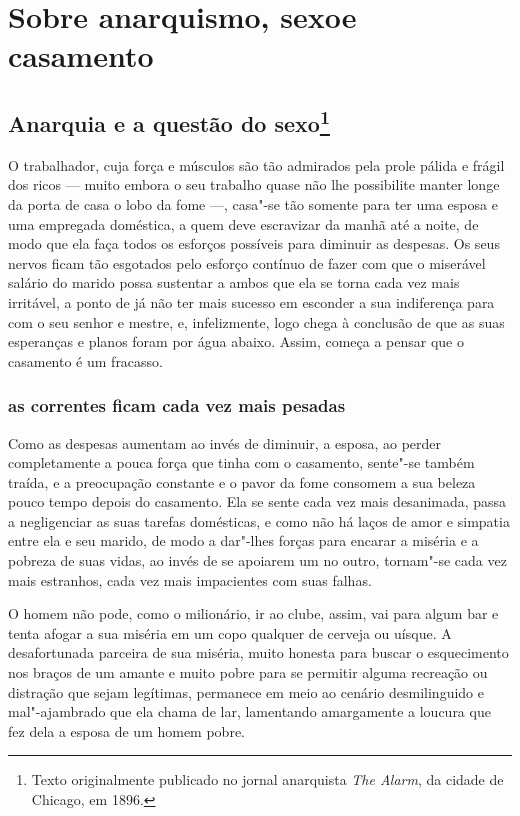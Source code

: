 \part[Sobre anarquismo, sexo e casamento]{Sobre anarquismo, sexo\break e casamento}

\pagestyle{baruch}

\chapter{Anarquia e a questão do sexo\footnote{Texto originalmente publicado no
  jornal anarquista \textit{The Alarm}, da cidade de Chicago, em 1896.}}
\label{ref1}

O trabalhador, cuja força e músculos são tão admirados pela prole pálida
e frágil dos ricos --- muito embora o seu trabalho quase não lhe
possibilite manter longe da porta de casa o lobo da fome ---, casa"-se tão
somente para ter uma esposa e uma empregada doméstica, a quem deve
escravizar da manhã até a noite, de modo que ela faça todos os esforços
possíveis para diminuir as despesas. Os seus nervos ficam tão esgotados
pelo esforço contínuo de fazer com que o miserável salário do marido
possa sustentar a ambos que ela se torna cada vez mais irritável, a ponto de 
já não ter mais sucesso em esconder a sua indiferença para com o seu
senhor e mestre, e, infelizmente, logo chega à conclusão de que as suas 
esperanças e planos foram por água abaixo. Assim, começa a pensar que o
casamento é um fracasso.

\section{as correntes ficam cada vez mais pesadas}

Como as despesas aumentam ao invés de diminuir, a esposa, ao perder
completamente a pouca força que tinha com o casamento, sente"-se também
traída, e a preocupação constante e o pavor da fome consomem a sua
beleza pouco tempo depois do casamento. Ela se sente cada vez
mais desanimada, passa a negligenciar as suas tarefas domésticas, e como
não há laços de amor e simpatia entre ela e seu marido, de modo a
dar"-lhes forças para encarar a miséria e a pobreza de suas vidas, ao
invés de se apoiarem um no outro, tornam"-se cada vez mais estranhos,
cada vez mais impacientes com suas falhas.

O homem não pode, como o milionário, ir ao clube, assim, vai para algum
bar e tenta afogar a sua miséria em um copo qualquer de cerveja ou
uísque. A desafortunada parceira de sua miséria, muito honesta
para buscar o esquecimento nos braços de um amante e muito pobre para se
permitir alguma recreação ou distração que sejam legítimas, permanece em
meio ao cenário desmilinguido e mal"-ajambrado que ela chama de lar,
lamentando amargamente a loucura que fez dela a esposa de um homem
pobre.

